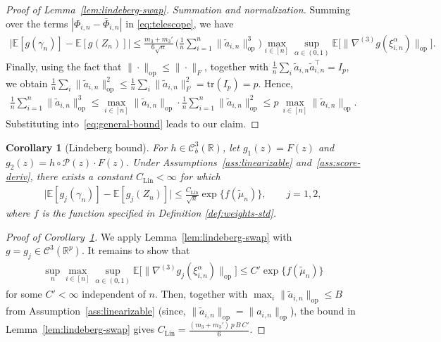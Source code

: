 \documentclass[12pt]{article}
\newcommand{\op}{\mathrm{op}}
\newtheorem{corollary}{Corollary}[section]
\newcommand{\real}{\mathbb{R}}
\newcommand{\Ee}{{\mathbb{E}}}
\newcommand{\cP}{{\mathcal{P}}}
\begin{document}
\begin{appendices}
\begin{proof}[Proof of Lemma~\ref{lem:lindeberg-swap}]
\medskip\noindent\textit{Summation and normalization.}
Summing over the terms $|\Phi_{i,n}-\bar\Phi_{i,n}|$ in \eqref{eq:telescope}, we have
\begin{align}
  \label{eq:general-bound}
  \big|\Ee[g(\gamma_n)]-\Ee[g(Z_n)]\big|
  \le\frac{m_3+m_3'}{6\sqrt n}\,
     \Big(\frac1n\sum_{i=1}^n\|\widetilde a_{i,n}\|_{\op}^3\Big)
     \max_{i\in[n]}\sup_{\alpha\in(0,1)}
     \Ee\big[\|\nabla^{(3)}g(\xi^\alpha_{i,n})\|_{\op}\big].
\end{align}
Finally, using the fact that $\|\cdot\|_{\op}\le\|\cdot\|_F$, together with
$\frac1n\sum_i\widetilde a_{i,n}\widetilde a_{i,n}^\top=I_p$, we obtain
$\frac1n\sum_i\|\widetilde a_{i,n}\|_{\op}^2
\le\frac1n\sum_i\|\widetilde a_{i,n}\|_F^2=\mathrm{tr}(I_p)=p$.
Hence,
\begin{align*}
  \frac1n\sum_{i=1}^n\|\widetilde a_{i,n}\|_{\op}^3
  \le\max_{i\in[n]}\|\widetilde a_{i,n}\|_{\op}\cdot
     \frac1n\sum_{i=1}^n\|\widetilde a_{i,n}\|_{\op}^2
  \le p\,\max_{i\in[n]}\|\widetilde a_{i,n}\|_{\op}.
\end{align*}
Substituting into~\eqref{eq:general-bound} leads to our claim.
\end{proof}



\begin{corollary}[Lindeberg bound]
\label{cor:lindeberg-final}
For $h\in\mathcal C^3_b(\real)$, let $g_1(z)=F(z)$ and $g_2(z)=h\circ\cP(z)\cdot F(z)$.
Under Assumptions~\ref{ass:linearizable} and~\ref{ass:score-deriv}, there exists a constant $C_{\mathrm{Lin}}<\infty$ for which
\begin{align*}
  \big|\Ee[g_j(\gamma_n)]-\Ee[g_j(Z_n)]\big|
  \le\frac{C_{\mathrm{Lin}}}{\sqrt n}\exp\{f(\widetilde\mu_n)\},
  \qquad j=1,2,
\end{align*}
where $f$ is the function specified in Definition \ref{def:weights-std}.
\end{corollary}

\begin{proof}[Proof of Corollary~\ref{cor:lindeberg-final}]
We apply Lemma~\ref{lem:lindeberg-swap} with $g=g_j\in\mathcal C^3(\real^p)$.
It remains to show that
\begin{align}
  \label{eq:xi_bound}
  \sup_n\max_{i\in[n]}\sup_{\alpha\in(0,1)}
  \Ee\big[\|\nabla^{(3)}g_j(\xi^\alpha_{i,n})\|_{\op}\big]
  \le C'\exp\{f(\widetilde\mu_n)\}
\end{align}
for some $C'<\infty$ independent of $n$.
Then, together with $\max_i\|\widetilde a_{i,n}\|_{\op}\le B$ from
Assumption~\ref{ass:linearizable} (since, $\|\widetilde a_{i,n}\|_{\op}=\|a_{i,n}\|_{\op}$), the bound in Lemma~\ref{lem:lindeberg-swap} gives $C_{\mathrm{Lin}}=\frac{(m_3+m_3')\,p\,B\,C'}{6}$.


\end{proof}
\end{appendices}
\end{document}
